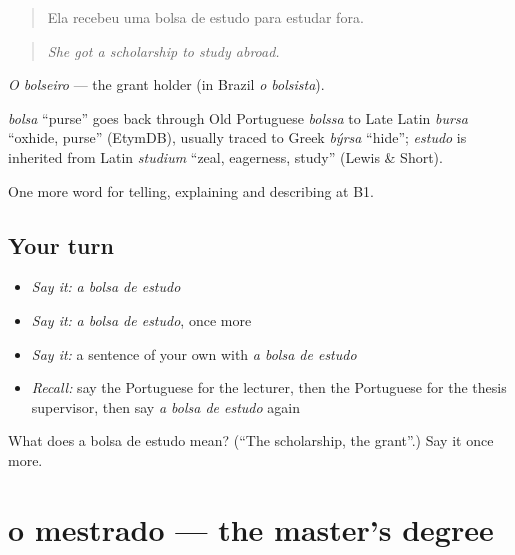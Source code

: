 \begin{quote}
Ela recebeu uma bolsa de estudo para estudar fora.
\end{quote}

\begin{quote}
\emph{She got a scholarship to study abroad.}
\end{quote}

\emph{O bolseiro} — the grant holder (in Brazil \emph{o bolsista}).

\begin{cousinweb}
\emph{bolsa} \textquotedblleft{}purse\textquotedblright{} goes back through Old Portuguese \emph{bolssa} to Late Latin \emph{bursa} \textquotedblleft{}oxhide, purse\textquotedblright{} (EtymDB), usually traced to Greek \emph{býrsa} \textquotedblleft{}hide\textquotedblright{}; \emph{estudo} is inherited from Latin \emph{studium} \textquotedblleft{}zeal, eagerness, study\textquotedblright{} (Lewis \& Short).
\end{cousinweb}

\begin{grammarlens}[title={What you've built}]
One more word for telling, explaining and describing at B1.
\end{grammarlens}

\subsection*{Your turn}
\begin{itemize}
\raggedright
  \item \emph{Say it:} \emph{a bolsa de estudo}
  \item \emph{Say it:} \emph{a bolsa de estudo}, once more
  \item \emph{Say it:} a sentence of your own with \emph{a bolsa de estudo}
  \item \emph{Recall:} say the Portuguese for the lecturer, then the Portuguese for the thesis supervisor, then say \emph{a bolsa de estudo} again
\end{itemize}

\begin{tcolorbox}[breakable,colback=teal!4,colframe=teal!35!black,title={Before you move on}]
What does a bolsa de estudo mean? (\textquotedblleft{}The scholarship, the grant\textquotedblright{}.) Say it once more.
\end{tcolorbox}
\section[o mestrado]{o mestrado — the master's degree}

